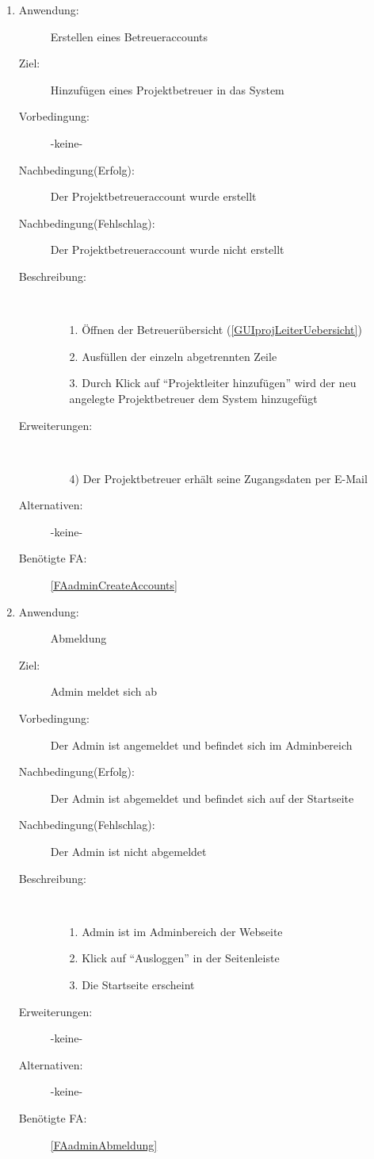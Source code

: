 \documentclass[parskip=full]{scrartcl}
\newcommand{\swtLabel}[1]{\textbf{/#1\arabic*0/}}
\begin{document}
\begin{enumerate} [label=\swtLabel{A}]
  \item \label{UCadminCreateBetreuer}
  \begin{description}
  \item[Anwendung:] Erstellen eines Betreueraccounts
  \item[Ziel:] Hinzufügen eines \gls{Projektbetreuer} in das System
  	\item[Vorbedingung:] -keine-
  	\item[Nachbedingung(Erfolg):] Der \gls{Projektbetreuer}account wurde erstellt
  	\item[Nachbedingung(Fehlschlag):] Der \gls{Projektbetreuer}account wurde nicht erstellt
  	\item[Beschreibung:]~
  	 \begin{enumerate} 
  	   \item[1.] Öffnen der Betreuerübersicht (\autoref{GUIprojLeiterUebersicht})
  	   \item[2.] Ausfüllen der einzeln abgetrennten Zeile  
  	   \item[3.] Durch Klick auf \enquote{Projektleiter hinzufügen} wird der neu
  	   angelegte \gls{Projektbetreuer} dem System hinzugefügt
  	 \end{enumerate} 
  	\item[Erweiterungen:]~
  	 \begin{enumerate}
  	   \item[4)] Der \gls{Projektbetreuer} erhält seine Zugangsdaten per E-Mail
  	 \end{enumerate}  
  \item[Alternativen:] -keine-
  \item[Benötigte FA:] \ref{FAadminCreateAccounts}
  \end{description}
  
  \item \label{UCadminLogout}
    \begin{description}
  	\item[Anwendung:] Abmeldung
  	\item[Ziel:] \gls{Admin} meldet sich ab
  	\item[Vorbedingung:] Der \gls{Admin} ist angemeldet und befindet sich im \gls{Admin}bereich
  	\item[Nachbedingung(Erfolg):] Der \gls{Admin} ist abgemeldet und befindet sich auf der Startseite
  	\item[Nachbedingung(Fehlschlag):] Der \gls{Admin} ist nicht abgemeldet
  	\item[Beschreibung:]~
  	\begin{enumerate}
  	  \item[1.] \gls{Admin} ist im \gls{Admin}bereich der Webseite
      \item[2.] Klick auf \enquote{Ausloggen} in der Seitenleiste
      \item[3.] Die Startseite erscheint
  	\end{enumerate}
  	\item[Erweiterungen:] -keine-
  	\item[Alternativen:] -keine-
  	\item[Benötigte FA:] \ref{FAadminAbmeldung}
  \end{description}
  

\end{enumerate}
\end{document}
